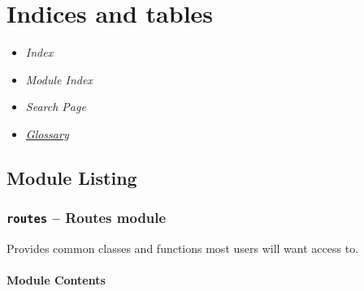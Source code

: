 \documentclass[letterpaper,10pt,english]{manual}
\begin{document}
\chapter{Indices and tables}
\begin{itemize}
\item {} 
\emph{Index}

\item {} 
\emph{Module Index}

\item {} 
\emph{Search Page}

\item {} 
\hyperlink{glossary}{\emph{Glossary}}

\end{itemize}


\section{Module Listing}

\resetcurrentobjects
\hypertarget{--doc-modules}{}

\subsection{\texttt{routes} -- Routes module}
\hypertarget{module-routes}{}
\modulesynopsis{}
Provides common classes and functions most users will want access to.


\subsubsection{Module Contents}
\end{document}

